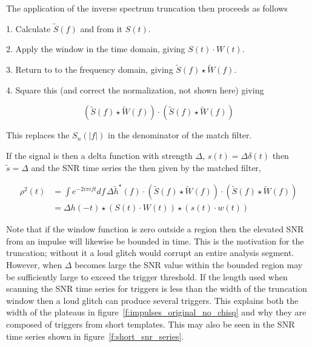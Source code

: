 The application of the inverse spectrum truncation then proceeds as
follows 

1. Calculate $\tilde{S}(f)$ and from it $S(t)$.

2. Apply the window in the time domain, giving $S(t) \cdot W(t)$.

3. Return to to the frequency domain, giving $\tilde{S}(f) \star
\tilde{W}(f)$.

4. Square this (and correct the normalization, not shown here) giving 

\begin{equation*}
(\tilde{S}(f) \star \tilde{W}(f)) \cdot (\tilde{S}(f) \star \tilde{W}(f)) 
\end{equation*}

This replaces the $S_n(|f|)$ in the denominator of the match filter.

If the signal is then a delta function with strength $\Delta$, $s(t) =
\Delta \delta(t)$ then $\tilde{s} = \Delta$  and the SNR time series
the then given by the matched filter,


\begin{align*}
\rho^2(t) &= \int e^{-2 i\pi i f t} df\, \Delta \tilde{h}^\star(f) \cdot
(\tilde{S}(f) \star \tilde{W}(f)) \cdot 
(\tilde{S}(f) \star \tilde{W}(f)) \\
&= \Delta h(-t) \star
(S(t) \cdot W(t)) \star
(s(t) \cdot w(t))
\end{align*}

Note that if the window function is zero outside a region then the
elevated SNR from an impulse will likewise be bounded in time.  This
is the motivation for the truncation; without it a loud glitch would
corrupt an entire analysis segment.  However, when $\Delta$ becomes
large the SNR value within the bounded region may be sufficiently
large to exceed the trigger threshold.  If the length used when
scanning the SNR time series for triggers is less than the width of
the truncation window then a loud glitch can produce several triggers.
This explains both the width of the plateaus in
figure~\ref{f:impulses_original_no_chisq} and why they are composed of
triggers from short templates.  This may also be seen in the SNR time
series shown in figure~\ref{f:short_snr_series}.

